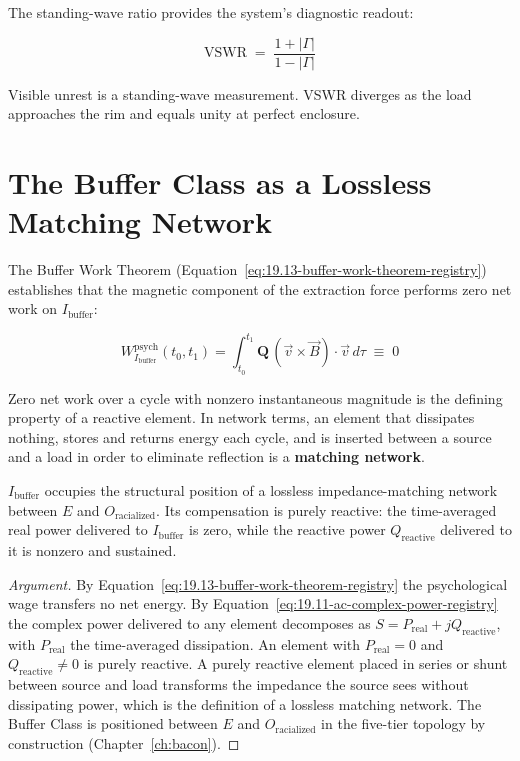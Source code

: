 The standing-wave ratio provides the system's diagnostic readout:

\begin{equation}\label{eq:xc.6-vswr}
\text{VSWR} \;=\; \frac{1 + |\Gamma|}{1 - |\Gamma|}
\end{equation}

Visible unrest is a standing-wave measurement. VSWR diverges as the load approaches the rim and
equals unity at perfect enclosure.

\section{The Buffer Class as a Lossless Matching Network}
\label{sec:xc_buffer}

The Buffer Work Theorem (Equation~\ref{eq:19.13-buffer-work-theorem-registry}) establishes that the
magnetic component of the extraction force performs zero net work on $I_{\text{buffer}}$:

\[
W_{I_{\text{buffer}}}^{\text{psych}}(t_0, t_1) = \int_{t_0}^{t_1} \mathbf{Q}\,(\vec{v} \times \vec{B}) \cdot \vec{v}\, d\tau \;\equiv\; 0
\]

Zero net work over a cycle with nonzero instantaneous magnitude is the defining property of a
reactive element. In network terms, an element that dissipates nothing, stores and returns energy
each cycle, and is inserted between a source and a load in order to eliminate reflection is a
\textbf{matching network}.

\begin{theorem}
\label{thm:buffer-matching}
$I_{\text{buffer}}$ occupies the structural position of a lossless impedance-matching network
between $E$ and $O_{\text{racialized}}$. Its compensation is purely reactive: the time-averaged
real power delivered to $I_{\text{buffer}}$ is zero, while the reactive power $Q_{\text{reactive}}$
delivered to it is nonzero and sustained.
\end{theorem}

\begin{proof}[Argument]
By Equation~\ref{eq:19.13-buffer-work-theorem-registry} the psychological wage transfers no net
energy. By Equation~\ref{eq:19.11-ac-complex-power-registry} the complex power delivered to any
element decomposes as $S = P_{\text{real}} + jQ_{\text{reactive}}$, with $P_{\text{real}}$ the
time-averaged dissipation. An element with $P_{\text{real}} = 0$ and $Q_{\text{reactive}} \neq 0$ is
purely reactive. A purely reactive element placed in series or shunt between source and load
transforms the impedance the source sees without dissipating power, which is the definition of a
lossless matching network. The Buffer Class is positioned between $E$ and $O_{\text{racialized}}$
in the five-tier topology by construction (Chapter~\ref{ch:bacon}). \end{proof}

